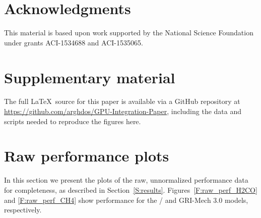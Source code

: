 \documentclass[preprint]{elsarticle}
\begin{document}
\section*{Acknowledgments}

This material is based upon work supported by the National Science Foundation under grants ACI-1534688 and ACI-1535065.

\appendix
\setcounter{figure}{0}

\renewcommand*{\thesection}{\appendixname~\Alph{section}}

\section{Supplementary material}

The full \LaTeX\ source for this paper is available via a GitHub repository at \url{https://github.com/arghdos/GPU-Integration-Paper}, including the data and scripts needed to reproduce the figures here.

\section{Raw performance plots}
\label{S:raw}

In this section we present the plots of the raw, unnormalized performance data for completeness, as described in Section~\ref{S:results}.
Figures~\ref{F:raw_perf_H2CO} and \ref{F:raw_perf_CH4} show performance for the \slash{} and GRI-Mech 3.0 models, respectively.
\end{document}
